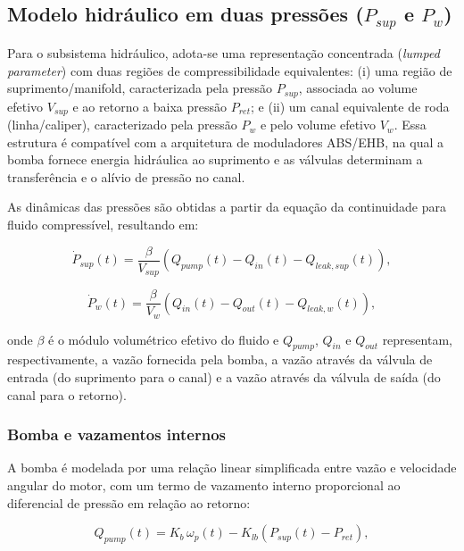 \subsection{Modelo hidráulico em duas pressões ($P_{sup}$ e $P_w$)}
\label{sec:controle-modelo-hidraulico-2p}

Para o subsistema hidráulico, adota-se uma representação concentrada (\textit{lumped parameter}) com duas regiões de compressibilidade equivalentes: (i) uma região de suprimento/manifold, caracterizada pela pressão $P_{sup}$, associada ao volume efetivo $V_{sup}$ e ao retorno a baixa pressão $P_{ret}$; e (ii) um canal equivalente de roda (linha/caliper), caracterizado pela pressão $P_w$ e pelo volume efetivo $V_w$. Essa estrutura é compatível com a arquitetura de moduladores ABS/EHB, na qual a bomba fornece energia hidráulica ao suprimento e as válvulas determinam a transferência e o alívio de pressão no canal.

As dinâmicas das pressões são obtidas a partir da equação da continuidade para fluido compressível, resultando em:

\begin{equation}
\dot{P}_{sup}(t) = \frac{\beta}{V_{sup}}\left(Q_{pump}(t) - Q_{in}(t) - Q_{leak,sup}(t)\right),
\label{eq:psup_dot}
\end{equation}

\begin{equation}
\dot{P}_{w}(t) = \frac{\beta}{V_{w}}\left(Q_{in}(t) - Q_{out}(t) - Q_{leak,w}(t)\right),
\label{eq:pw_dot}
\end{equation}

onde $\beta$ é o módulo volumétrico efetivo do fluido e $Q_{pump}$, $Q_{in}$ e $Q_{out}$ representam, respectivamente, a vazão fornecida pela bomba, a vazão através da válvula de entrada (do suprimento para o canal) e a vazão através da válvula de saída (do canal para o retorno).

\subsubsection{Bomba e vazamentos internos}
\label{sec:controle-bomba-2p}

A bomba é modelada por uma relação linear simplificada entre vazão e velocidade angular do motor, com um termo de vazamento interno proporcional ao diferencial de pressão em relação ao retorno:

\begin{equation}
Q_{pump}(t) = K_b\,\omega_p(t) - K_{lb}\left(P_{sup}(t) - P_{ret}\right),
\label{eq:qpump_2p}
\end{equation}

